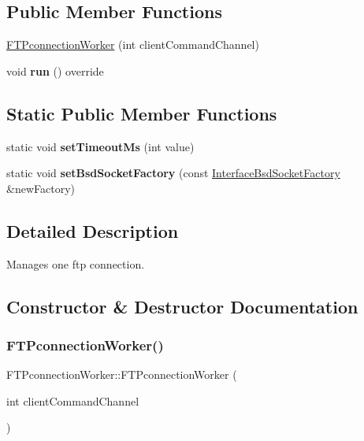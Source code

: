 \subsection*{Public Member Functions}
\begin{DoxyCompactItemize}
\item 
\hyperlink{classFTPconnectionWorker_a6763cf440da5695484f0ec06feb84b38}{F\+T\+Pconnection\+Worker} (int client\+Command\+Channel)
\item 
\mbox{\label{classFTPconnectionWorker_a60ea10b434bcd8c7ad8e39e0f0e61ed6}} 
void {\bfseries run} () override
\end{DoxyCompactItemize}
\subsection*{Static Public Member Functions}
\begin{DoxyCompactItemize}
\item 
\mbox{\label{classFTPconnectionWorker_a3772837b65d47738e76df6078e48dab4}} 
static void {\bfseries set\+Timeout\+Ms} (int value)
\item 
\mbox{\label{classFTPconnectionWorker_a3760a2531e1fa2a5717ba4775be36dab}} 
static void {\bfseries set\+Bsd\+Socket\+Factory} (const \hyperlink{classInterfaceBsdSocketFactory}{Interface\+Bsd\+Socket\+Factory} \&new\+Factory)
\end{DoxyCompactItemize}


\subsection{Detailed Description}
Manages one ftp connection. 

\subsection{Constructor \& Destructor Documentation}
\mbox{\label{classFTPconnectionWorker_a6763cf440da5695484f0ec06feb84b38}} 
\subsubsection{\texorpdfstring{F\+T\+Pconnection\+Worker()}{FTPconnectionWorker()}}
{\footnotesize\ttfamily F\+T\+Pconnection\+Worker\+::\+F\+T\+Pconnection\+Worker (\begin{DoxyParamCaption}\item[{int}]{client\+Command\+Channel }\end{DoxyParamCaption})}


